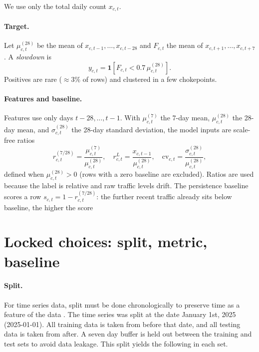 \documentclass[11pt]{article}
\begin{document}
We use only the total daily count $x_{c,t}$.

\paragraph{Target.}
Let $\mu^{(28)}_{c,t}$ be the mean of $x_{c,t-1},\dots,x_{c,t-28}$ and $F_{c,t}$ the mean of $x_{c,t+1},\dots,x_{c,t+7}$. A \emph{slowdown} is
\begin{equation}
y_{c,t} = \mathbf{1}\!\left[F_{c,t} < 0.7\,\mu^{(28)}_{c,t}\right].
\end{equation}
Positives are rare ($\approx 3\%$ of rows) and clustered in a few chokepoints. 

\paragraph{Features and baseline.}
Features use only days $t-28,\dots,t-1$. With $\mu^{(7)}_{c,t}$ the 7-day mean, $\mu^{(28)}_{c,t}$ the 28-day mean, and $\sigma^{(28)}_{c,t}$ the 28-day standard deviation, the model inputs are scale-free ratios
\[
r^{(7/28)}_{c,t}=\frac{\mu^{(7)}_{c,t}}{\mu^{(28)}_{c,t}},\quad
r^{L}_{c,t}=\frac{x_{c,t-1}}{\mu^{(28)}_{c,t}},\quad
\mathrm{cv}_{c,t}=\frac{\sigma^{(28)}_{c,t}}{\mu^{(28)}_{c,t}},
\]
defined when $\mu^{(28)}_{c,t}>0$ (rows with a zero baseline are excluded). Ratios are used because the label is relative and raw traffic levels drift. The persistence baseline scores a row $s_{c,t}=1-r^{(7/28)}_{c,t}$: the further recent traffic already sits below baseline, the higher the score

\section{Locked choices: split, metric, baseline}  %
\paragraph{Split.}
For time series data, split must be done chronologically to preserve time as a feature of the data \cite{faouzi}. The time series was split at the date January 1st, 2025 (2025-01-01). All training data is taken from before that date, and all testing data is taken from after. A seven day buffer is held out between the training and test sets to avoid data leakage. This split yields the following in each set. 
\end{document}
